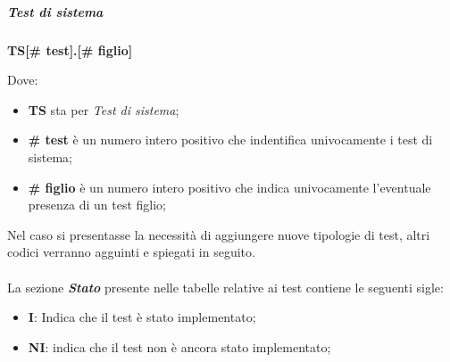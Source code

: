 \subparagraph{Test di sistema}
\begin{center}
    \textbf{TS[\# test].[\# figlio]}
\end{center}
Dove:
\begin{itemize}
    \item \textbf{TS} sta per \textit{Test di sistema};
    \item \textbf{\# test} è un numero intero positivo che indentifica univocamente i test di sistema;
    \item \textbf{\# figlio} è un numero intero positivo che indica univocamente l'eventuale presenza di un test figlio;
\end{itemize}
Nel caso si presentasse la necessità di aggiungere nuove tipologie di test, altri codici verranno agguinti e spiegati in seguito.\\\\
La sezione \textbf{\textit{Stato}} presente nelle tabelle relative ai test contiene le seguenti sigle:
\begin{itemize}
    \item \textbf{I}: Indica che il test è stato implementato;
    \item \textbf{NI}: indica che il test non è ancora stato implementato;
\end{itemize}

